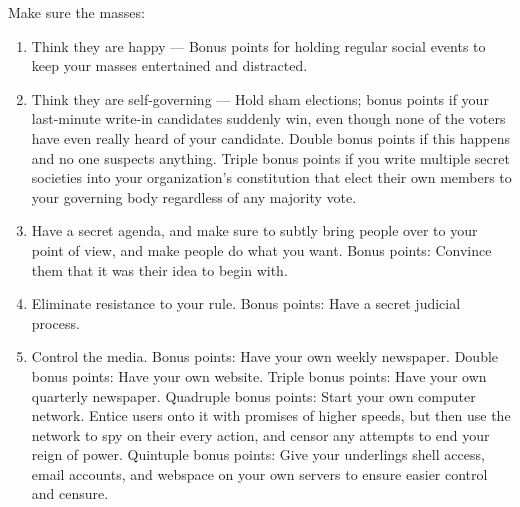 \documentclass[9pt]{extarticle}
\begin{document}
\begin{minipage}[t]{.61\linewidth}
Make sure the masses:
\begin{enumerate}
\item Think they are happy — Bonus points for holding regular social events
to keep your masses entertained and distracted.

\item Think they are self-governing — Hold sham elections; bonus points if 
your last-minute write-in candidates suddenly win, even though none of the 
voters have even really heard of your candidate. Double bonus points if 
this happens and no one suspects anything. Triple bonus points if you write
multiple secret societies into your organization's constitution that elect
their own members to your governing body regardless of any majority vote.

\item Have a secret agenda, and make sure to subtly bring people over to
your point of view, and make people do what you want. Bonus points: Convince
them that it was their idea to begin with.

\item Eliminate resistance to your rule. Bonus points: Have a secret 
judicial process.

\item Control the media. Bonus points: Have your own weekly newspaper. 
Double bonus points: Have your own website. Triple bonus points: Have your 
own quarterly newspaper. Quadruple bonus points: Start your own computer 
network. Entice users onto it with promises of higher speeds, but then use 
the network to spy on their every action, and censor any attempts to end 
your reign of power. Quintuple bonus points: Give your underlings shell 
access, email accounts, and webspace on your own servers to ensure easier
control and censure.
\end{enumerate}

\end{minipage} %
\end{document}
